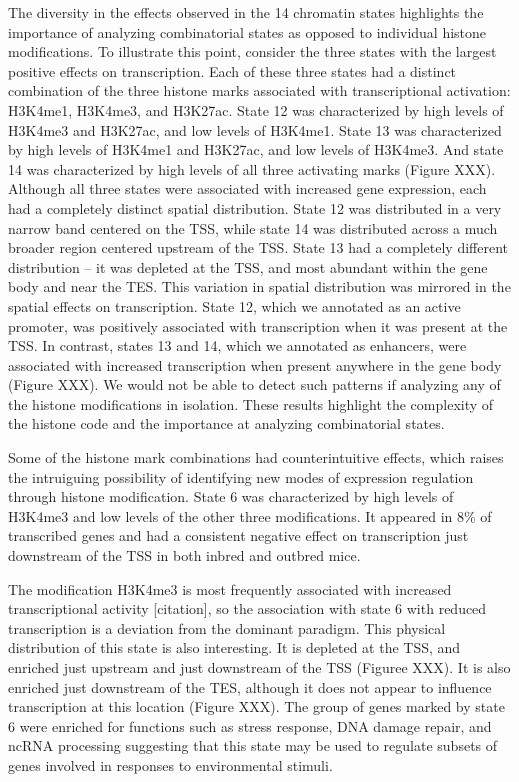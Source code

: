 \documentclass[10pt,letterpaper]{article}
\begin{document}
The diversity in the effects observed in the 14 chromatin states
highlights the importance of analyzing combinatorial states as opposed
to individual histone modifications. To illustrate this point, consider
the three states with the largest positive effects on transcription.
Each of these three states had a distinct combination of the three
histone marks associated with transcriptional activation: H3K4me1,
H3K4me3, and H3K27ac. State 12 was characterized by high levels of
H3K4me3 and H3K27ac, and low levels of H3K4me1. State 13 was
characterized by high levels of H3K4me1 and H3K27ac, and low levels of
H3K4me3. And state 14 was characterized by high levels of all three
activating marks (Figure XXX). Although all three states were associated
with increased gene expression, each had a completely distinct spatial
distribution. State 12 was distributed in a very narrow band centered on
the TSS, while state 14 was distributed across a much broader region
centered upstream of the TSS. State 13 had a completely different
distribution -- it was depleted at the TSS, and most abundant within the
gene body and near the TES. This variation in spatial distribution was
mirrored in the spatial effects on transcription. State 12, which we
annotated as an active promoter, was positively associated with
transcription when it was present at the TSS. In contrast, states 13 and
14, which we annotated as enhancers, were associated with increased
transcription when present anywhere in the gene body (Figure XXX). We
would not be able to detect such patterns if analyzing any of the
histone modifications in isolation. These results highlight the
complexity of the histone code and the importance at analyzing
combinatorial states.

Some of the histone mark combinations had counterintuitive effects,
which raises the intruiguing possibility of identifying new modes of
expression regulation through histone modification. State 6 was
characterized by high levels of H3K4me3 and low levels of the other
three modifications. It appeared in 8\% of transcribed genes and had a
consistent negative effect on transcription just downstream of the TSS
in both inbred and outbred mice.

The modification H3K4me3 is most frequently associated with increased
transcriptional activity {[}citation{]}, so the association with state 6
with reduced transcription is a deviation from the dominant paradigm.
This physical distribution of this state is also interesting. It is
depleted at the TSS, and enriched just upstream and just downstream of
the TSS (Figuree XXX). It is also enriched just downstream of the TES,
although it does not appear to influence transcription at this location
(Figure XXX). The group of genes marked by state 6 were enriched for
functions such as stress response, DNA damage repair, and ncRNA
processing suggesting that this state may be used to regulate subsets of
genes involved in responses to environmental stimuli.
\end{document}
